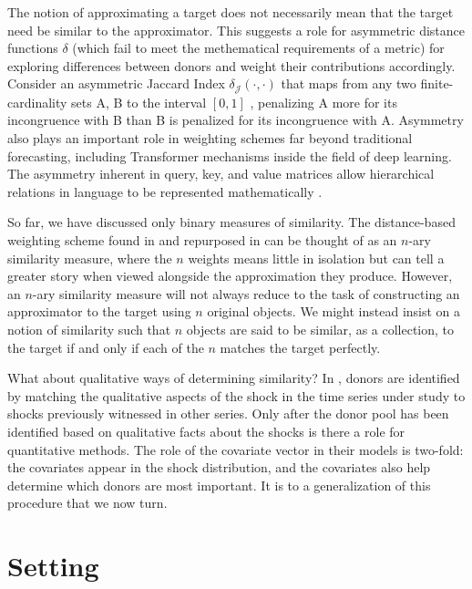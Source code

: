 \documentclass[11pt]{article}
\theoremstyle{definition}
\begin{document}
The notion of approximating a target does not necessarily mean that the target need be similar to the approximator.  This suggests a role for asymmetric distance functions $\delta$ (which fail to meet the methematical requirements of a metric) for exploring differences between donors and weight their contributions accordingly.  Consider an asymmetric Jaccard Index $\delta_{\mathcal{J}}(\cdot,\cdot)$ that maps from any two finite-cardinality sets A, B to the interval $[0,1]$ \citep{garg2015asymmetric}, penalizing A more for its incongruence with B than B is penalized for its incongruence with A.  Asymmetry also plays an important role in weighting schemes far beyond traditional forecasting, including Transformer mechanisms inside the field of deep learning.  The asymmetry inherent in query, key, and value matrices allow hierarchical relations in language to be represented mathematically \citep[p. 364]{bishop2023deep}.  

So far, we have discussed only binary measures of similarity.  The distance-based weighting scheme found in \cite{lin2021minimizing} and repurposed in \cite{lundquist2024volatility} can be thought of as an $n$-ary similarity measure, where the $n$ weights means little in isolation but can tell a greater story when viewed alongside the approximation they produce.  However, an $n$-ary similarity measure will not always reduce to the task of constructing an approximator to the target using $n$ original objects.  We might instead insist on a notion of similarity such that $n$ objects are said to be similar, as a collection, to the target if and only if each of the $n$ matches the target perfectly.

What about qualitative ways of determining similarity?  In \cite{lin2021minimizing, lundquist2024volatility}, donors are identified by matching the qualitative aspects of the shock in the time series under study to shocks previously witnessed in other series.  Only after the donor pool has been identified based on qualitative facts about the shocks is there a role for quantitative methods.  The role of the covariate vector in their models is two-fold: the covariates appear in the shock distribution, and the covariates also help determine which donors are most important.  It is to a generalization of this procedure that we now turn.

\section{Setting}\label{Setting}
\end{document}

